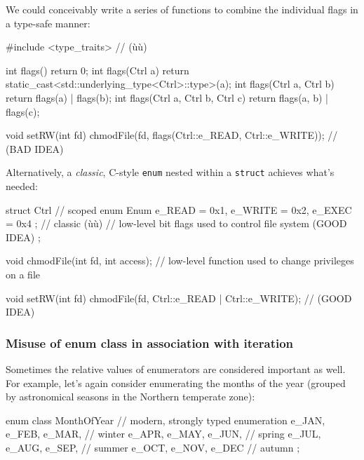 \noindent We could conceivably write a series of functions to combine the
individual flags in a type-safe manner:

\begin{emcppslisting}[emcppsbatch=e14]
#include <type_traits>  // (ù{}ù)

int flags() { return 0; }
int flags(Ctrl a) { return static_cast<std::underlying_type<Ctrl>::type>(a); }
int flags(Ctrl a, Ctrl b) { return flags(a) | flags(b); }
int flags(Ctrl a, Ctrl b, Ctrl c) { return flags(a, b) | flags(c); }

void setRW(int fd)
{
    chmodFile(fd, flags(Ctrl::e_READ, Ctrl::e_WRITE));  // (BAD IDEA)
}
\end{emcppslisting}

\noindent Alternatively, a \emph{classic}, C-style \lstinline!enum! nested within a
\lstinline!struct! achieves what's needed:

\begin{emcppslisting}
struct Ctrl // scoped
{
    enum Enum { e_READ = 0x1, e_WRITE = 0x2, e_EXEC = 0x4 };  // classic (ù{}ù)
        // low-level bit flags used to control file system (GOOD IDEA)
};

void chmodFile(int fd, int access);
    // low-level function used to change privileges on a file

void setRW(int fd)
{
    chmodFile(fd, Ctrl::e_READ | Ctrl::e_WRITE);  // (GOOD IDEA)
}
\end{emcppslisting}


\subsubsection[Misuse of \lstinline!enum! \lstinline!class! in association with iteration]{Misuse of {\SubsubsecCode enum} {\SubsubsecCode class} in association with iteration}\label{misuse-of-enum-class-in-association-with-iteration}

Sometimes the relative values of enumerators are considered important as
well. For example, let's again consider enumerating the months of the
year (grouped by astronomical seasons in the Northern temperate zone):

\begin{emcppslisting}[emcppsbatch={e15,e16}]
enum class MonthOfYear  // modern, strongly typed enumeration
{
    e_JAN, e_FEB, e_MAR,  // winter
    e_APR, e_MAY, e_JUN,  // spring
    e_JUL, e_AUG, e_SEP,  // summer
    e_OCT, e_NOV, e_DEC   // autumn
};
\end{emcppslisting}

